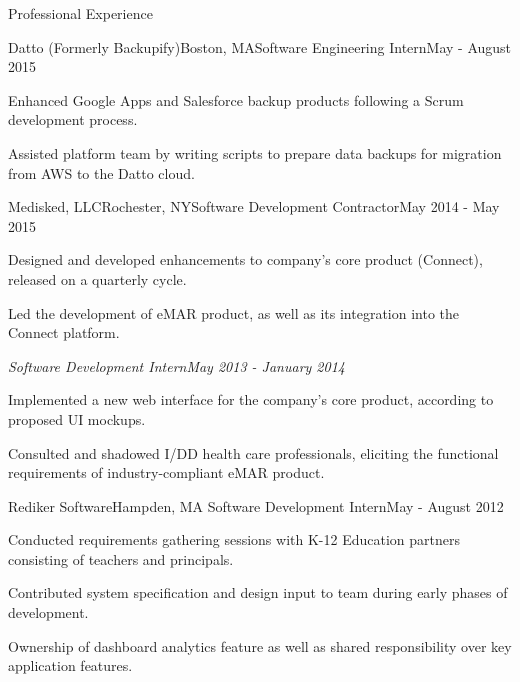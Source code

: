 \documentclass{resume} %
\begin{document}
\begin{rSection}{Professional Experience}

\begin{rSubsection}{Datto (Formerly Backupify)}{Boston, MA}{Software Engineering Intern}{May - August 2015}
\item Enhanced Google Apps and Salesforce backup products following a Scrum development process.
\item Assisted platform team by writing scripts to prepare data backups for migration from AWS to the Datto cloud. 
\end{rSubsection}


\begin{rSubsection}{Medisked, LLC}{Rochester, NY}{Software Development Contractor}{May 2014 - May 2015}
\item Designed and developed enhancements to company's core product (Connect), released on a quarterly cycle. 
\item Led the development of eMAR product, as well as its integration into the Connect platform.

{\sl Software Development Intern}\hfill{\sl May 2013 - January 2014}
\item Implemented a new web interface for the company's core product, according to proposed UI mockups.
\item Consulted and shadowed I/DD health care professionals, eliciting the functional 	requirements of industry-compliant eMAR product.   
\end{rSubsection}


\begin{rSubsection}{Rediker Software}{Hampden, MA}
{Software Development Intern}{May - August 2012}
\item Conducted requirements gathering sessions with K-12 Education partners consisting of teachers and principals.
\item Contributed system specification and design input to team during early phases of development.
\item Ownership of dashboard analytics feature as well as shared responsibility over key application features.
\end{rSubsection}

\end{rSection}






\end{document}
